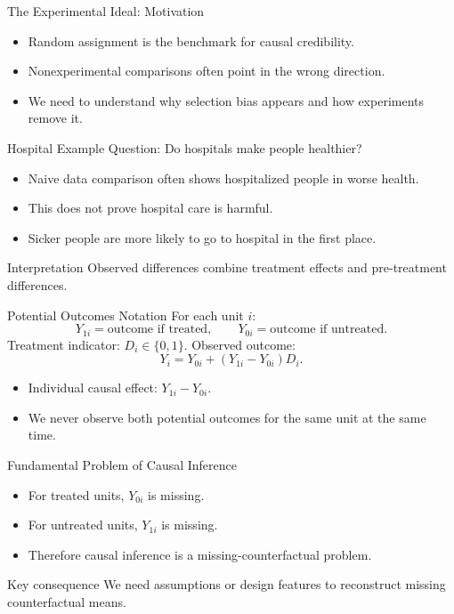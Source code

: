 \documentclass[11pt,aspectratio=169]{beamer}
\begin{document}
\begin{frame}{The Experimental Ideal: Motivation}
  \begin{itemize}
    \item Random assignment is the benchmark for causal credibility.
    \item Nonexperimental comparisons often point in the wrong direction.
    \item We need to understand why selection bias appears and how experiments remove it.
  \end{itemize}
\end{frame}

\begin{frame}{Hospital Example}
  Question: Do hospitals make people healthier?
  \begin{itemize}
    \item Naive data comparison often shows hospitalized people in worse health.
    \item This does not prove hospital care is harmful.
    \item Sicker people are more likely to go to hospital in the first place.
  \end{itemize}
  \begin{block}{Interpretation}
    Observed differences combine treatment effects and pre-treatment differences.
  \end{block}
\end{frame}

\begin{frame}{Potential Outcomes Notation}
  \hypertarget{main:po}{}
  For each unit \(i\):
  \[
  Y_{1i} = \text{outcome if treated}, \qquad Y_{0i} = \text{outcome if untreated}.
  \]
  Treatment indicator: \(D_i \in \{0,1\}\).
  Observed outcome:
  \[
  Y_i = Y_{0i} + (Y_{1i}-Y_{0i})D_i.
  \]
  \begin{itemize}
    \item Individual causal effect: \(Y_{1i}-Y_{0i}\).
    \item We never observe both potential outcomes for the same unit at the same time.
  \end{itemize}
\end{frame}

\begin{frame}{Fundamental Problem of Causal Inference}
  \begin{itemize}
    \item For treated units, \(Y_{0i}\) is missing.
    \item For untreated units, \(Y_{1i}\) is missing.
    \item Therefore causal inference is a missing-counterfactual problem.
  \end{itemize}
  \begin{block}{Key consequence}
    We need assumptions or design features to reconstruct missing counterfactual means.
  \end{block}
\end{frame}
\end{document}
